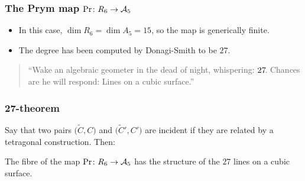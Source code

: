 \begin{frame}
\frametitle{The Prym map $\Pr \colon R_6 \to \mathcal{A}_5$}

\begin{itemize}
	\item In this case, $\dim R_6 = \dim A_5 = 15$, so the map is generically finite.
	\pause
	\item The degree has  been computed by Donagi-Smith to be $27$.
\end{itemize}

\pause

\vfill
\begin{quote}
    \large
    ``Wake an algebraic geometer in the dead of night, \phantom{``}whispering: $27\mkern-3mu$. Chances are he will respond: Lines on a \phantom{``}cubic surface.''
\end{quote}
\vfill 

\end{frame}

\begin{frame}
\frametitle{27-theorem}

Say that two pairs $\Big(\widetilde C, C\Big)$ and $\Big(\widetilde C', C'\Big)$ are \alert{incident} if they are related by a tetragonal construction. Then:

\pause
\hfill
\hfill

\begin{theorem}
The fibre of the map $\mathrm{Pr}\colon R_6 \to \mathcal{A}_5$ has the structure of the $27$ lines on a cubic surface.
\end{theorem}

\end{frame}